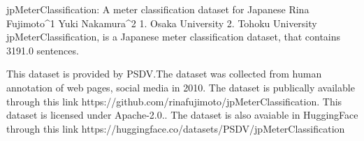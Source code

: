 
jpMeterClassification: A meter classification dataset for Japanese
Rina Fujimoto^1 Yuki Nakamura^2
1. Osaka University 2. Tohoku University
jpMeterClassification, is a Japanese meter classification dataset, that contains 3191.0 sentences.

This dataset is provided by PSDV.The dataset was collected from human annotation of web pages, social media in 2010. 
The dataset is publically available through this link https://github.com/rinafujimoto/jpMeterClassification. This dataset is licensed under Apache-2.0..
The dataset is also avaiable in HuggingFace through this link https://huggingface.co/datasets/PSDV/jpMeterClassification

